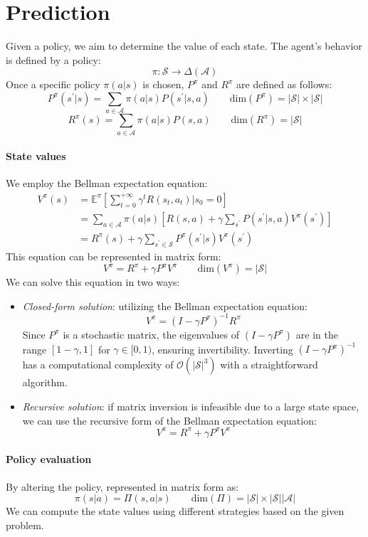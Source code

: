 \section{Prediction}

Given a policy, we aim to determine the value of each state. 
The agent's behavior is defined by a policy:
\[\pi:\mathcal{S}\rightarrow\Delta(\mathcal{A})\]
Once a specific policy $\pi(a|s)$ is chosen, $P^\pi$ and $R^\pi$ are defined as follows:
\[P^\pi(s^\prime|s)=\sum_{a\in\mathcal{A}}\pi(a|s)P(s^\prime|s,a)\qquad\text{dim}(P^\pi)=\left\lvert \mathcal{S}\right\rvert\times\left\lvert \mathcal{S}\right\rvert\]
\[R^\pi(s)=\sum_{a\in\mathcal{A}}\pi(a|s)P(s,a)\qquad\text{dim}(R^\pi)=\left\lvert \mathcal{S}\right\rvert\]

\paragraph*{State values}
We employ the Bellman expectation equation:
\begin{align*}
    V^\pi(s)    &=\mathbb{E}^\pi\left[\sum_{t=0}^{+\infty}\gamma^tR(s_t,a_t)|s_0=0\right] \\
                &=\sum_{a \in \mathcal{A}}\pi(a|s)\left[R(s,a)+\gamma\sum_{s^\prime}P(s^\prime|s,a)V^\pi(s^\prime)\right] \\
                &=R^\pi(s)+\gamma\sum_{s^\prime\in\mathcal{S}}P^\pi(s^\prime|s)V^\pi(s^\prime)
\end{align*}
This equation can be represented in matrix form:
\[V^\pi=R^\pi+\gamma P^\pi V^\pi\qquad\text{dim}(V^\pi)=\left\lvert \mathcal{S} \right\rvert\]
We can solve this equation in two ways:
\begin{itemize}
    \item \textit{Closed-form solution}: utilizing the Bellman expectation equation:
        \[V^\pi=(I-\gamma P^\pi)^{-1}R^\pi\]
        Since $P^\pi$ is a stochastic matrix, the eigenvalues of $(I - \gamma P^\pi)$ are in the range $[1-\gamma,1]$ for $\gamma \in [0, 1)$, ensuring invertibility.
        Inverting $(I-\gamma P^\pi)^{-1}$ has a computational complexity of $\mathcal{O}(\left\lvert\mathcal{S}\right\rvert ^3)$ with a straightforward algorithm.
    \item \textit{Recursive solution}: if matrix inversion is infeasible due to a large state space, we can use the recursive form of the Bellman expectation equation:
        \[V^\pi = R^\pi + \gamma P^\pi V^\pi\] 
\end{itemize}

\paragraph*{Policy evaluation}
By altering the policy, represented in matrix form as:
\[\pi(s|a)=\Pi(s,a|s)\qquad\text{dim}(\Pi)=\left\lvert \mathcal{S}\right\rvert\times\left\lvert \mathcal{S}\right\rvert\left\lvert \mathcal{A}\right\rvert\]
We can compute the state values using different strategies based on the given problem.